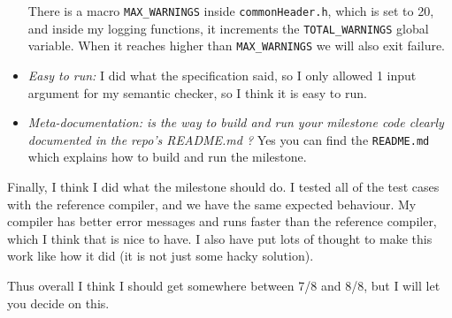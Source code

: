 \documentclass{article}
\begin{document}
\begin{itemize}
        There is a macro \verb|MAX_WARNINGS| inside \verb|commonHeader.h|, which is set to 20, and inside my logging functions, it increments the \verb|TOTAL_WARNINGS| global variable. When it reaches higher than \verb|MAX_WARNINGS| we will also exit failure.

    \item \emph{Easy to run:} I did what the specification said, so I only allowed 1 input argument for my semantic checker, so I think it is easy to run.

    \item \emph{Meta-documentation: is the way to build and run your milestone code clearly documented in the repo's README.md ? }
        Yes you can find the \verb|README.md| which explains how to build and run the milestone.

\end{itemize}

Finally, I think I did what the milestone should do. 
I tested all of the test cases with the reference compiler, and we have the same expected behaviour. My compiler has better error messages and runs faster than the reference compiler, which I think that is nice to have.
I also have put lots of thought to make this work like how it did (it is not just some hacky solution).

Thus overall I think I should get somewhere between 7/8 and 8/8, but I will let you decide on this.
\end{document}
